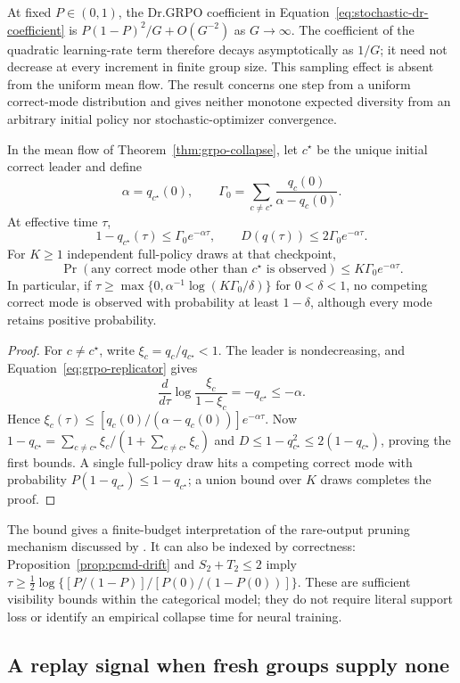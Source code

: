 At fixed $P\in(0,1)$, the Dr.GRPO coefficient in
Equation~\eqref{eq:stochastic-dr-coefficient} is
$P(1-P)^2/G+O(G^{-2})$ as $G\to\infty$. The coefficient of the
quadratic learning-rate term therefore decays asymptotically as $1/G$;
it need not decrease at every increment in finite group size. This sampling
effect is absent from the uniform mean flow. The result concerns one step
from a uniform correct-mode distribution and gives neither monotone expected
diversity from an arbitrary initial policy nor stochastic-optimizer convergence.

\begin{corollary}
\enforcehalffinalproseline
\label{cor:finite-budget-invisibility}
In the mean flow of Theorem~\ref{thm:grpo-collapse}, let $c^\star$ be the
unique initial correct leader and define
\[
 \alpha=q_{c^\star}(0),
 \qquad
 \Gamma_0=\sum_{c\ne c^\star}
             \frac{q_c(0)}{\alpha-q_c(0)}.
\]
At effective time $\tau$,
\begin{equation}
 1-q_{c^\star}(\tau)\le\Gamma_0e^{-\alpha\tau},
 \qquad D(q(\tau))\le2\Gamma_0e^{-\alpha\tau}.
 \label{eq:finite-minority-bound}
\end{equation}
For $K\ge1$ independent full-policy draws at that checkpoint,
\begin{equation}
 \Pr(\text{any correct mode other than }c^\star\text{ is observed})
 \le K\Gamma_0e^{-\alpha\tau}.
 \label{eq:finite-inference-visibility}
\end{equation}
In particular, if
$\tau\ge\max\{0,\alpha^{-1}\log(K\Gamma_0/\delta)\}$ for
$0<\delta<1$, no competing correct mode is observed with probability at
least $1-\delta$, although every mode retains positive probability.
\end{corollary}

\begin{proof}
\enforcehalffinalproseline
For $c\ne c^\star$, write $\xi_c=q_c/q_{c^\star}<1$.
The leader is nondecreasing, and Equation~\eqref{eq:grpo-replicator} gives
\[
 \frac{d}{d\tau}\log\frac{\xi_c}{1-\xi_c}
 =-q_{c^\star}\le-\alpha.
\]
Hence
$\xi_c(\tau)\le[q_c(0)/(\alpha-q_c(0))]e^{-\alpha\tau}$.
Now $1-q_{c^\star}=\sum_{c\ne c^\star}\xi_c/(1+\sum_{c\ne c^\star}\xi_c)$
and $D\le1-q_{c^\star}^2\le2(1-q_{c^\star})$, proving the first bounds.
A single full-policy draw hits a competing correct mode with probability
$P(1-q_{c^\star})\le1-q_{c^\star}$; a union bound over $K$ draws completes
the proof.
\end{proof}

The bound gives a finite-budget interpretation of the rare-output pruning
mechanism discussed by \citet[Section~4.2.5]{lochab2026ucpo}.
It can also be indexed by correctness: Proposition~\ref{prop:pcmd-drift}
and $S_2+T_2\le2$ imply
$\tau\ge\tfrac12\log\{[P/(1-P)]/[P(0)/(1-P(0))]\}$.
These are sufficient visibility bounds within the categorical model;
they do not require literal support loss or identify an empirical collapse
time for neural training.


\subsection{A replay signal when fresh groups supply none}
